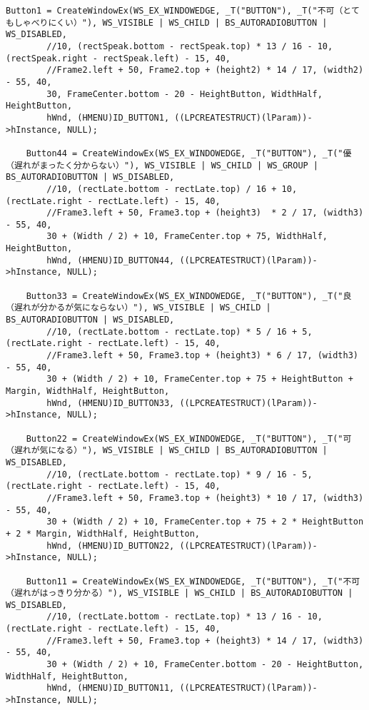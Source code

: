 \begin{lstlisting}[caption=window.cpp]
	Button1 = CreateWindowEx(WS_EX_WINDOWEDGE, _T("BUTTON"), _T("不可（とてもしゃべりにくい）"), WS_VISIBLE | WS_CHILD | BS_AUTORADIOBUTTON | WS_DISABLED,
		//10, (rectSpeak.bottom - rectSpeak.top) * 13 / 16 - 10, (rectSpeak.right - rectSpeak.left) - 15, 40,
		//Frame2.left + 50, Frame2.top + (height2) * 14 / 17, (width2) - 55, 40,
		30, FrameCenter.bottom - 20 - HeightButton, WidthHalf, HeightButton,
		hWnd, (HMENU)ID_BUTTON1, ((LPCREATESTRUCT)(lParam))->hInstance, NULL);

	Button44 = CreateWindowEx(WS_EX_WINDOWEDGE, _T("BUTTON"), _T("優　（遅れがまったく分からない）"), WS_VISIBLE | WS_CHILD | WS_GROUP | BS_AUTORADIOBUTTON | WS_DISABLED,
		//10, (rectLate.bottom - rectLate.top) / 16 + 10, (rectLate.right - rectLate.left) - 15, 40,
		//Frame3.left + 50, Frame3.top + (height3)  * 2 / 17, (width3) - 55, 40,
		30 + (Width / 2) + 10, FrameCenter.top + 75, WidthHalf, HeightButton,
		hWnd, (HMENU)ID_BUTTON44, ((LPCREATESTRUCT)(lParam))->hInstance, NULL);

	Button33 = CreateWindowEx(WS_EX_WINDOWEDGE, _T("BUTTON"), _T("良　（遅れが分かるが気にならない）"), WS_VISIBLE | WS_CHILD | BS_AUTORADIOBUTTON | WS_DISABLED,
		//10, (rectLate.bottom - rectLate.top) * 5 / 16 + 5, (rectLate.right - rectLate.left) - 15, 40,
		//Frame3.left + 50, Frame3.top + (height3) * 6 / 17, (width3) - 55, 40,
		30 + (Width / 2) + 10, FrameCenter.top + 75 + HeightButton + Margin, WidthHalf, HeightButton,
		hWnd, (HMENU)ID_BUTTON33, ((LPCREATESTRUCT)(lParam))->hInstance, NULL);

	Button22 = CreateWindowEx(WS_EX_WINDOWEDGE, _T("BUTTON"), _T("可　（遅れが気になる）"), WS_VISIBLE | WS_CHILD | BS_AUTORADIOBUTTON | WS_DISABLED,
		//10, (rectLate.bottom - rectLate.top) * 9 / 16 - 5, (rectLate.right - rectLate.left) - 15, 40,
		//Frame3.left + 50, Frame3.top + (height3) * 10 / 17, (width3) - 55, 40,
		30 + (Width / 2) + 10, FrameCenter.top + 75 + 2 * HeightButton + 2 * Margin, WidthHalf, HeightButton,
		hWnd, (HMENU)ID_BUTTON22, ((LPCREATESTRUCT)(lParam))->hInstance, NULL);

	Button11 = CreateWindowEx(WS_EX_WINDOWEDGE, _T("BUTTON"), _T("不可（遅れがはっきり分かる）"), WS_VISIBLE | WS_CHILD | BS_AUTORADIOBUTTON | WS_DISABLED,
		//10, (rectLate.bottom - rectLate.top) * 13 / 16 - 10, (rectLate.right - rectLate.left) - 15, 40,
		//Frame3.left + 50, Frame3.top + (height3) * 14 / 17, (width3) - 55, 40,
		30 + (Width / 2) + 10, FrameCenter.bottom - 20 - HeightButton, WidthHalf, HeightButton,
		hWnd, (HMENU)ID_BUTTON11, ((LPCREATESTRUCT)(lParam))->hInstance, NULL);


\end{lstlisting}
